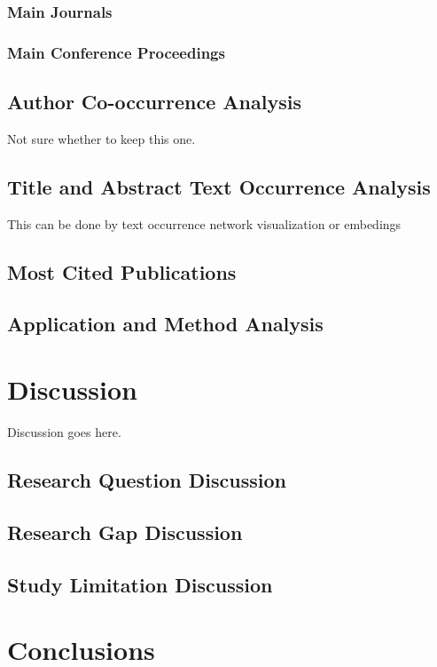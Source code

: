 \documentclass[parskip=full]{scrartcl}
\begin{document}
\subsubsection{Main Journals}

\subsubsection{Main Conference Proceedings}

\subsection{Author Co-occurrence Analysis}

Not sure whether to keep this one.

\subsection{Title and Abstract Text Occurrence Analysis}

This can be done by text occurrence network visualization or embedings

\subsection{Most Cited Publications}

\subsection{Application and Method Analysis}

\section{Discussion}

Discussion goes here.

\subsection{Research Question Discussion}

\subsection{Research Gap Discussion}

\subsection{Study Limitation Discussion}

\section{Conclusions}



\end{document}
